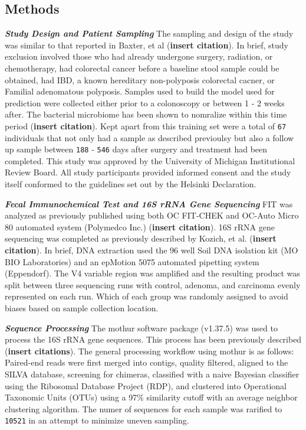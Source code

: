 \documentclass[12pt,]{article}
\begin{document}
\newpage

\subsection{Methods}\label{methods}

\textbf{\emph{Study Design and Patient Sampling}} The sampling and
design of the study was similar to that reported in Baxter, et al
(\textbf{insert citation}). In brief, study exclusion involved those who
had already undergone surgery, radiation, or chemotherapy, had
colorectal cancer before a baseline stool sample could be obtained, had
IBD, a known hereditary non-polyposis colorectal cacner, or Familial
adenomatous polyposis. Samples used to build the model used for
prediction were collected either prior to a colonoscopy or between 1 - 2
weeks after. The bacterial microbiome has been shown to nomralize within
this time period (\textbf{insert citation}). Kept apart from this
training set were a total of \texttt{67} individuals that not only had a
sample as described previoulsy but also a follow up sample between
\texttt{188} - \texttt{546} days after surgery and treatment had been
completed. This study was approved by the University of Michigan
Institutional Review Board. All study participants provided informed
consent and the study itself conformed to the guidelines set out by the
Helsinki Declaration.

\textbf{\emph{Fecal Immunochemical Test and 16S rRNA Gene Sequencing}}
FIT was analyzed as previously published using both OC FIT-CHEK and
OC-Auto Micro 80 automated system (Polymedco Inc.) (\textbf{insert
citation}). 16S rRNA gene sequencing was completed as previously
described by Kozich, et al. (\textbf{insert citation}). In brief, DNA
extraction used the 96 well Soil DNA isolation kit (MO BIO Laboratories)
and an epMotion 5075 automated pipetting system (Eppendorf). The V4
variable region was amplified and the resulting product was split
between three sequencing runs with control, adenoma, and carcinoma
evenly represented on each run. Which of each group was randomly
assigned to avoid biases based on sample collection location.

\textbf{\emph{Sequence Processing}} The mothur software package
(v1.37.5) was used to process the 16S rRNA gene sequences. This process
has been previously described (\textbf{insert citations}). The general
processing workflow using mothur is as follows: Paired-end reads were
first merged into contigs, quality filtered, aligned to the SILVA
database, screening for chimeras, classified with a naive Bayesian
classifier using the Ribosomal Database Project (RDP), and clustered
into Operational Taxonomic Units (OTUs) using a 97\% similarity cutoff
with an average neighbor clustering algorithm. The numer of sequences
for each sample was rarified to \texttt{10521} in an attempt to minimize
uneven sampling.
\end{document}
